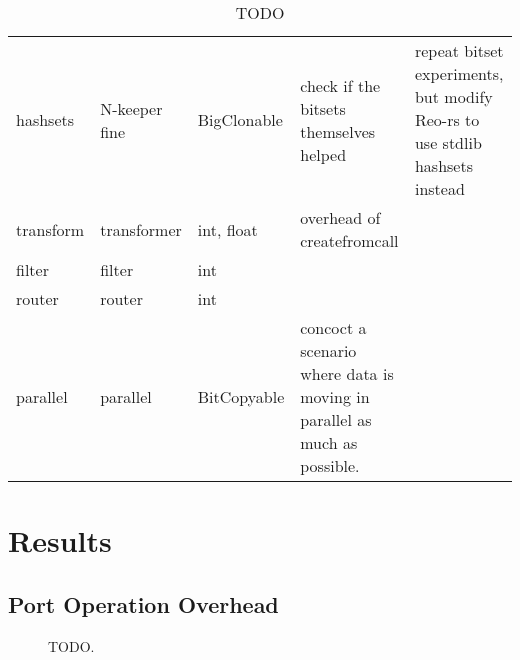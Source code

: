 \begin{landscape}
\begin{table}[p!]
\begin{adjustbox}{width=19cm}
\begin{tabular}{l|ll|p{46mm}p{67mm}}
hashsets & N-keeper fine & BigClonable & check if the bitsets themselves helped & repeat bitset experiments, but modify Reo-rs to use stdlib hashsets instead \\

transform & transformer & int, float & overhead of createfromcall & \\

filter & filter & int & & \\

router & router & int & & \\

parallel & parallel & BitCopyable & concoct a scenario where data is moving in parallel as much as possible. & 

\end{tabular}
\end{adjustbox}
\caption[TODO]{TODO}	
\end{table}
\end{landscape}

\section{Results}

\subsection{Port Operation Overhead}

\begin{figure}
	\centering
	\caption[TODO]{TODO.}
	\label{fig:exper_rtt}
\end{figure}


